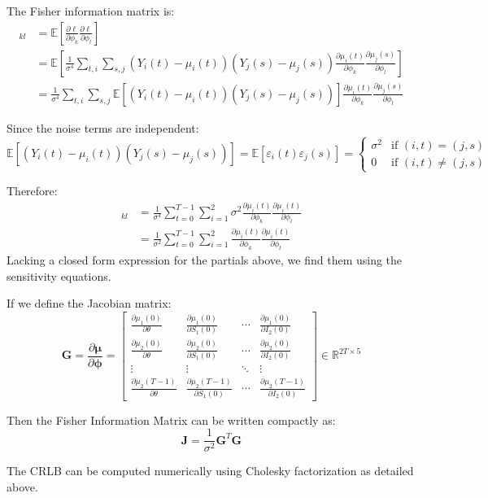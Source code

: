 The Fisher information matrix is:
\begin{align*}
  [\mathbf{J}]_{kl} &= \mathbb{E}\left[\frac{\partial \ell}{\partial \phi_k}\frac{\partial \ell}{\partial \phi_l}\right] \\
  &= \mathbb{E}\left[\frac{1}{\sigma^4} \sum_{t,i} \sum_{s,j} (Y_i(t) - \mu_i(t))(Y_j(s) - \mu_j(s)) \frac{\partial \mu_i(t)}{\partial \phi_k}\frac{\partial \mu_j(s)}{\partial \phi_l}\right] \\
  &= \frac{1}{\sigma^4} \sum_{t,i} \sum_{s,j} \mathbb{E}[(Y_i(t) - \mu_i(t))(Y_j(s) - \mu_j(s))] \frac{\partial \mu_i(t)}{\partial \phi_k}\frac{\partial \mu_j(s)}{\partial \phi_l}
\end{align*}

Since the noise terms are independent:
\begin{equation*}
\mathbb{E}[(Y_i(t) - \mu_i(t))(Y_j(s) - \mu_j(s))] = \mathbb{E}[\varepsilon_i(t)\varepsilon_j(s)] = \begin{cases}
\sigma^2 & \text{if } (i,t) = (j,s) \\
0 & \text{if } (i,t) \neq (j,s)
\end{cases}
\end{equation*}

Therefore:
\begin{align*}
  [\mathbf{J}]_{kl} &= \frac{1}{\sigma^4}
  \sum_{t=0}^{T-1}\sum_{i=1}^{2} \sigma^2 \frac{\partial
    \mu_i(t)}{\partial \phi_k}\frac{\partial \mu_i(t)}{\partial
    \phi_l} \\
  &= \frac{1}{\sigma^2} \sum_{t=0}^{T-1}\sum_{i=1}^{2} \frac{\partial
    \mu_i(t)}{\partial \phi_k}\frac{\partial \mu_i(t)}{\partial
    \phi_l}
\end{align*}
Lacking a closed form expression for the partials above, we find them
using the sensitivity equations.

If we define the Jacobian matrix:
\begin{equation}
  \mathbf{G} = \frac{\partial \boldsymbol{\mu}}{\partial
    \boldsymbol{\phi}} = \begin{bmatrix} \frac{\partial
      \mu_1(0)}{\partial \theta} & \frac{\partial \mu_1(0)}{\partial
      S_1(0)} & \cdots & \frac{\partial \mu_1(0)}{\partial I_2(0)} \\
    \frac{\partial \mu_2(0)}{\partial \theta} & \frac{\partial
      \mu_2(0)}{\partial S_1(0)} & \cdots & \frac{\partial
      \mu_2(0)}{\partial I_2(0)} \\
    \vdots & \vdots & \ddots & \vdots \\
    \frac{\partial \mu_2(T-1)}{\partial \theta} & \frac{\partial
      \mu_2(T-1)}{\partial S_1(0)} & \cdots & \frac{\partial
      \mu_2(T-1)}{\partial I_2(0)}
  \end{bmatrix} \in \mathbb{R}^{2T \times 5}
\end{equation}

Then the Fisher Information Matrix can be written compactly as:
\begin{equation}
\mathbf{J} = \frac{1}{\sigma^2} \mathbf{G}^T \mathbf{G}
\end{equation}

The CRLB can be computed numerically using Cholesky factorization as detailed above.
